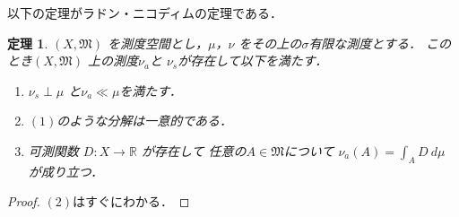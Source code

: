\documentclass[leqno, a4paper, 12pt]{jsarticle}
\newtheorem{thm}{定理}
\newcommand{\rr}{\mathbb{R}}
\begin{document}
以下の定理がラドン・ニコディムの定理である．
\begin{thm}
$(X, \mathfrak{M})$
を測度空間とし，$\mu$，$\nu$
をその上の$\sigma$有限な測度とする．
このとき$(X, \mathfrak{M})$
上の測度$\nu_{a}$と
$\nu_{s}$が存在して以下を満たす．
\begin{enumerate}
\item 
$\nu_{s}\perp \mu$
と$\nu_{a}\ll \mu$を満たす．
\item 
$(1)$のような分解は一意的である．
\item 
可測関数
$D: X\to \rr$
が存在して
任意の$A\in \mathfrak{M}$について
$\nu_{a}(A)=\int_{A}D\ d\mu$
が成り立つ．
\end{enumerate}
\end{thm}
\begin{proof}
$(2)$はすぐにわかる．


\end{proof}
\end{document}
